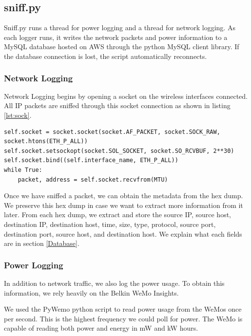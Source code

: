 \subsection{sniff.py}
\label{sniff.py}
Sniff.py runs a thread for power logging and a thread for network logging. As each logger runs, it writes the network packets and power information to a MySQL database hosted on AWS through the python MySQL client \cite{mysqlclient} library. If the database connection is lost, the script automatically reconnects.

\subsubsection{Network Logging}
Network Logging begins by opening a socket on the wireless interfaces connected. All IP packets are sniffed through this socket connection as shown in listing \ref{lst:sock}.

\noindent
\begin{minipage}{\textwidth}
\begin{lstlisting}[label={lst:sock},caption={Open and Read from a Socket},captionpos=b]
self.socket = socket.socket(socket.AF_PACKET, socket.SOCK_RAW, socket.htons(ETH_P_ALL))
self.socket.setsockopt(socket.SOL_SOCKET, socket.SO_RCVBUF, 2**30)
self.socket.bind((self.interface_name, ETH_P_ALL))
while True:
    packet, address = self.socket.recvfrom(MTU)
\end{lstlisting}
\end{minipage}

Once we have sniffed a packet, we can obtain the metadata from the hex dump. We preserve this hex dump in case we want to extract more information from it later. From each hex dump, we extract and store the source IP, source host, destination IP, destination host, time, size, type, protocol, source port, destination port, source host, and destination host. We explain what each fields are in section \ref{Database}.

\subsubsection{Power Logging}
In addition to network traffic, we also log the power usage. To obtain this information, we rely heavily on the Belkin WeMo Insights.

We used the PyWemo python script \cite{pywemo} to read power usage from the WeMos once per second. This is the highest frequency we could poll for power. The WeMo is capable of reading both power and energy in mW and kW hours.

